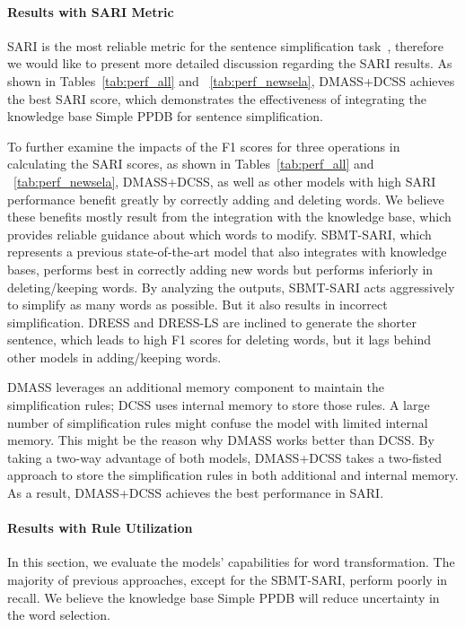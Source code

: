 \documentclass[11pt,a4paper]{article}
\begin{document}
\paragraph{Results with SARI Metric}
\label{sec:sari}

SARI is the most reliable metric for the sentence simplification task~\cite{xu2016optimizing}, therefore we would like to present more detailed discussion regarding the SARI results. As shown in Tables~\ref{tab:perf_all} and ~\ref{tab:perf_newsela}, DMASS+DCSS achieves the best SARI score, which demonstrates the effectiveness of integrating the knowledge base Simple PPDB for sentence simplification.   

To further examine the impacts of the F1 scores for three operations in calculating the SARI scores, as shown in Tables~\ref{tab:perf_all} and ~\ref{tab:perf_newsela}, DMASS+DCSS, as well as other models with high SARI performance benefit greatly by correctly adding and deleting words. We believe these benefits mostly result from the integration with the knowledge base, which provides reliable guidance about which words to modify. 
SBMT-SARI, which represents a previous state-of-the-art model that also integrates with knowledge bases, performs best in correctly adding new words but performs inferiorly in deleting/keeping words. By analyzing the outputs, SBMT-SARI acts aggressively to simplify as many words as possible. But it also results in incorrect simplification. DRESS and DRESS-LS are inclined to generate the shorter sentence, which leads to high F1 scores for deleting words, but it lags behind other models in adding/keeping words.



DMASS leverages an additional memory component to maintain the simplification rules; DCSS uses internal memory to store those rules. A large number of simplification rules might confuse the model with limited internal memory. This might be the reason why DMASS works better than DCSS.
By taking a two-way advantage of both models, DMASS+DCSS takes a two-fisted approach to store the simplification rules in both additional and internal memory. As a result, DMASS+DCSS achieves the best performance in SARI.

\paragraph{Results with Rule Utilization}
\label{sec:rule}

In this section, we evaluate the models' capabilities for word transformation. The majority of previous approaches, except for the SBMT-SARI, perform poorly in recall. We believe the knowledge base Simple PPDB will reduce uncertainty in the word selection. 
\end{document}
